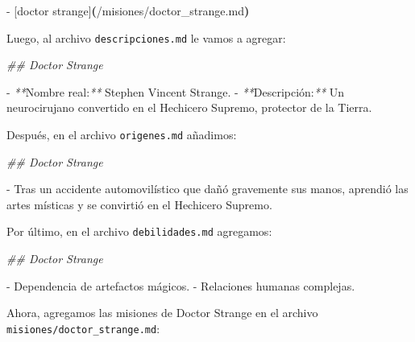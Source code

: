 \documentclass[
]{book}
\newenvironment{Shaded}{\begin{snugshade}}{\end{snugshade}}
\newcommand{\CommentTok}[1]{\textcolor[rgb]{0.56,0.35,0.01}{\textit{#1}}}
\newcommand{\ErrorTok}[1]{\textcolor[rgb]{0.64,0.00,0.00}{\textbf{#1}}}
\newcommand{\ExtensionTok}[1]{#1}
\newcommand{\KeywordTok}[1]{\textcolor[rgb]{0.13,0.29,0.53}{\textbf{#1}}}
\newcommand{\NormalTok}[1]{#1}
\newcommand{\PreprocessorTok}[1]{\textcolor[rgb]{0.56,0.35,0.01}{\textit{#1}}}
\begin{document}
\begin{Shaded}
\begin{Highlighting}[]
\ExtensionTok{{-}}\NormalTok{ [doctor strange]}\ErrorTok{(}\ExtensionTok{/misiones/doctor\_strange.md}\KeywordTok{)}
\end{Highlighting}
\end{Shaded}

Luego, al archivo \texttt{descripciones.md} le vamos a agregar:

\begin{Shaded}
\begin{Highlighting}[]

\CommentTok{\#\# Doctor Strange}

\ExtensionTok{{-}} \PreprocessorTok{**}\NormalTok{Nombre real:}\PreprocessorTok{**}\NormalTok{ Stephen Vincent Strange.}
\ExtensionTok{{-}} \PreprocessorTok{**}\NormalTok{Descripción:}\PreprocessorTok{**}\NormalTok{ Un neurocirujano convertido en el Hechicero Supremo, protector de la Tierra.}
\end{Highlighting}
\end{Shaded}

Después, en el archivo \texttt{origenes.md} añadimos:

\begin{Shaded}
\begin{Highlighting}[]

\CommentTok{\#\# Doctor Strange}

\ExtensionTok{{-}}\NormalTok{ Tras un accidente automovilístico que dañó gravemente sus manos, aprendió las artes místicas y se convirtió en el Hechicero Supremo.}
\end{Highlighting}
\end{Shaded}

Por último, en el archivo \texttt{debilidades.md} agregamos:

\begin{Shaded}
\begin{Highlighting}[]

\CommentTok{\#\# Doctor Strange}

\ExtensionTok{{-}}\NormalTok{ Dependencia de artefactos mágicos.}
\ExtensionTok{{-}}\NormalTok{ Relaciones humanas complejas.}
\end{Highlighting}
\end{Shaded}

Ahora, agregamos las misiones de Doctor Strange en el archivo \texttt{misiones/doctor\_strange.md}:
\end{document}
